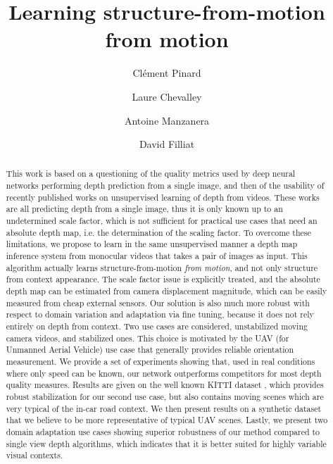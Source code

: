 \documentclass[runningheads]{llncs}
\title{Learning 
structure-from-motion
from motion}
\author{Clément Pinard\inst{1,2} \and Laure Chevalley\inst{2} \and Antoine Manzanera\inst{1} \and David Filliat\inst{1}
}
\institute{
ENSTA ParisTech \\
Computer Science and System Engineering Department\\
Palaiseau, France\\
\email{\{clement.pinard, antoine.manzanera, david.filliat\}@ensta-parsitech.fr}
\and
Parrot,
Paris, France\\
\email{laure.chevalley@parrot.com}
}
\begin{document}
\maketitle

\begin{abstract}
This work is based on a questioning of the quality metrics used by deep neural networks performing depth prediction from a single image, and then of the usability
of recently published works on unsupervised learning of depth from videos. These works are all predicting depth from a single image, thus it is only known up to an undetermined scale factor,
which is not sufficient for practical 
use cases that need an absolute depth map, i.e. the determination of the scaling factor. 
To overcome these limitations, we propose to learn in the same unsupervised manner a depth map inference system from monocular videos that takes a pair of images as input. This algorithm
actually
learns 
structure-from-motion {\em from motion}, and not only structure from context appearance.
The scale factor issue is explicitly treated, and the absolute 
depth map
can be estimated from camera displacement magnitude, which can be easily measured from cheap external sensors. Our solution is also 
much more robust with respect to
domain variation and adaptation via 
fine tuning,
because it does not rely entirely on depth from context. Two 
use cases
are considered, 
unstabilized moving camera videos,
and stabilized ones. This choice is motivated by the UAV (for Unmanned Aerial Vehicle)
use case
that generally provides reliable orientation measurement. We provide a set of experiments 
showing that, used
in real conditions where only speed can be known, our network outperforms competitors for most depth quality measures. Results are given on the well known KITTI dataset \cite{geiger2013vision}, which provides robust stabilization for our second 
use case,
but 
also
contains moving scenes which are 
very typical of the in-car road context. We then present results on a synthetic dataset that we believe to be more representative of typical UAV scenes. Lastly, we present two domain adaptation use cases showing superior robustness of our method compared to single view depth algorithms, 
which indicates that
it is better suited for 
highly variable visual contexts.
\end{abstract}
\end{document}
